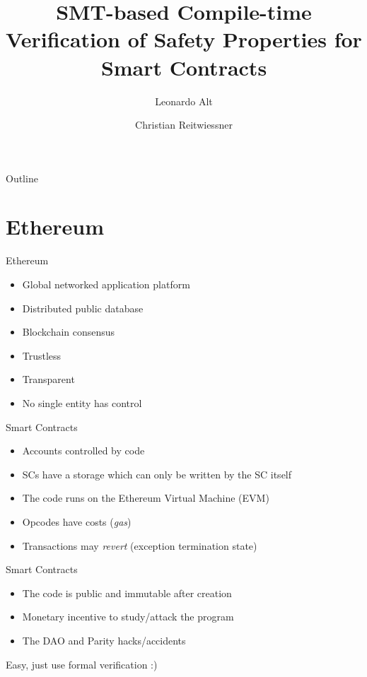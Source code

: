 \documentclass{beamer}
\title{SMT-based Compile-time Verification of Safety Properties for Smart Contracts}
\author{Leonardo Alt \and Christian Reitwiessner}
\institute{Ethereum Foundation}
\begin{document}
\begin{frame}
  \titlepage
\end{frame}

\begin{frame}{Outline}
  \tableofcontents
\end{frame}

\section{Ethereum}

\begin{frame}{Ethereum}
\begin{itemize}
	\item Global networked application platform \bigskip
	\item Distributed public database \bigskip
	\item Blockchain consensus \bigskip
	\pause
	\item Trustless \bigskip
	\item Transparent \bigskip
	\item No single entity has control \bigskip
\end{itemize}
\end{frame}

\begin{frame}{Smart Contracts}
\begin{itemize}
	\item Accounts controlled by code \bigskip
	\item SCs have a storage which can only be written by the SC itself \bigskip
	\item The code runs on the Ethereum Virtual Machine (EVM) \bigskip
	\item Opcodes have costs (\emph{gas}) \bigskip
	\item Transactions may \emph{revert} (exception termination state) \bigskip
\end{itemize}
\end{frame}

\begin{frame}{Smart Contracts}
\begin{itemize}
	\item The code is public and immutable after creation \bigskip
	\item Monetary incentive to study/attack the program \bigskip
	\item The DAO and Parity hacks/accidents \bigskip
\end{itemize}
\pause
Easy, just use formal verification :)
\end{frame}
\end{document}

